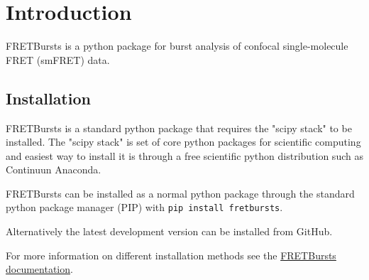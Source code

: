 \section{Introduction}

FRETBursts is a python package for burst analysis of confocal single-molecule FRET (smFRET) data.

\subsection{Installation}
FRETBursts is a standard python package that requires the "scipy stack" to be installed.
The "scipy stack" is set of core python packages for scientific computing and easiest way to install it is through a free scientific python distribution such as Continuun Anaconda.

FRETBursts can be installed as a normal python package through the standard python package manager (PIP) with 
\verb|pip install fretbursts|.

Alternatively the latest development version can be installed from GitHub.

For more information on different installation methods see the \href{http://fretbursts.readthedocs.org/installation.html#installation}{FRETBursts documentation}.

